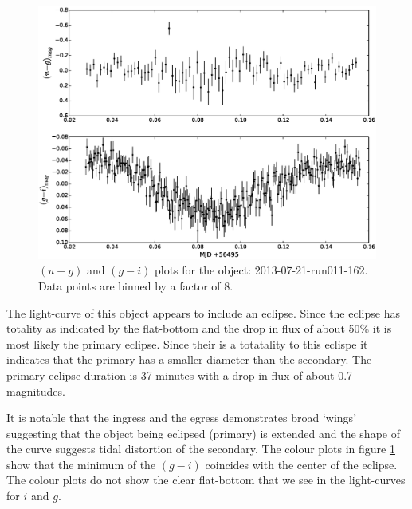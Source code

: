 \begin{figure}
  \center
  \includegraphics[width=120mm]{images/2013-07-21-run011-162_colourcurve-bin8.eps}
  \caption{$(u - g)$ and $(g - i)$ plots for the object: 2013-07-21-run011-162. Data points are binned by a factor of 8.}
  \label{fig:2013-07-21-run011-162-colour}
\end{figure} 

The light-curve of this object appears to include an eclipse. Since the eclipse has totality as indicated by the flat-bottom and the drop in flux of about 50\% it is most likely the primary eclipse. Since their is a totatality to this eclispe it indicates that the primary has a smaller diameter than the secondary. The primary eclipse duration is 37 minutes with a drop in flux of about 0.7 magnitudes. 

It is notable that the ingress and the egress demonstrates broad `wings' suggesting that the object being eclipsed (primary) is extended and the shape of the curve suggests tidal distortion of the secondary. The colour plots in figure \ref{fig:2013-07-21-run011-162-colour} show that the minimum of the $(g-i)$ coincides with the center of the eclipse. The colour plots do not show the clear flat-bottom that we see in the light-curves for $i$ and $g$. 


